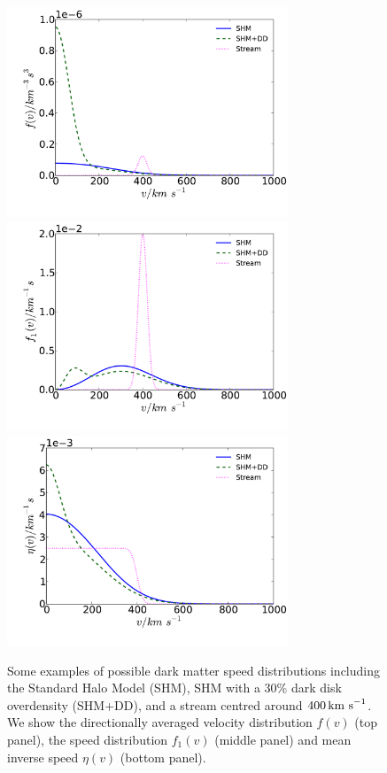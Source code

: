 \begin{figure}[p!]
  \centering
  \includegraphics[width=0.75\textwidth]{DirectDetection/f.pdf}
  \includegraphics[width=0.75\textwidth]{DirectDetection/f1.pdf}
  \includegraphics[width=0.75\textwidth]{DirectDetection/eta.pdf}
  \caption[Examples of dark matter speed distributions]{Some examples of possible dark matter speed distributions including the Standard Halo Model (SHM), SHM with a 30\% dark disk overdensity (SHM+DD), and a stream centred around $400 \,\textrm{km s}^{-1}$. We show the directionally averaged velocity distribution $f(v)$ (top panel), the speed distribution $f_1(v)$ (middle panel) and mean inverse speed $\eta(v)$ (bottom panel).}
  \label{fig:DD:SpeedDists}
\end{figure}


